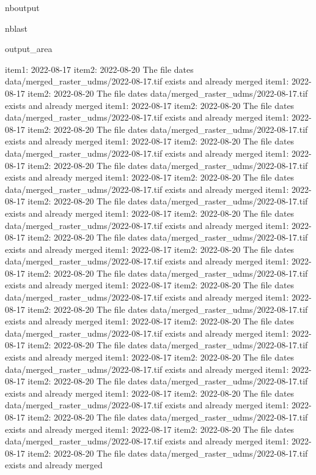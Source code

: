 \documentclass[letterpaper,10pt]{sphinxmanual}
\begin{document}
\begin{sphinxuseclass}{nboutput}
\begin{sphinxuseclass}{nblast}
{\begin{sphinxuseclass}{output_area}
\begin{sphinxuseclass}{}
\begin{sphinxVerbatim}[commandchars=\\\{\}]
item1:  2022-08-17
item2:  2022-08-20
The file dates data/merged\_raster\_udms/2022-08-17.tif exists and already merged
item1:  2022-08-17
item2:  2022-08-20
The file dates data/merged\_raster\_udms/2022-08-17.tif exists and already merged
item1:  2022-08-17
item2:  2022-08-20
The file dates data/merged\_raster\_udms/2022-08-17.tif exists and already merged
item1:  2022-08-17
item2:  2022-08-20
The file dates data/merged\_raster\_udms/2022-08-17.tif exists and already merged
item1:  2022-08-17
item2:  2022-08-20
The file dates data/merged\_raster\_udms/2022-08-17.tif exists and already merged
item1:  2022-08-17
item2:  2022-08-20
The file dates data/merged\_raster\_udms/2022-08-17.tif exists and already merged
item1:  2022-08-17
item2:  2022-08-20
The file dates data/merged\_raster\_udms/2022-08-17.tif exists and already merged
item1:  2022-08-17
item2:  2022-08-20
The file dates data/merged\_raster\_udms/2022-08-17.tif exists and already merged
item1:  2022-08-17
item2:  2022-08-20
The file dates data/merged\_raster\_udms/2022-08-17.tif exists and already merged
item1:  2022-08-17
item2:  2022-08-20
The file dates data/merged\_raster\_udms/2022-08-17.tif exists and already merged
item1:  2022-08-17
item2:  2022-08-20
The file dates data/merged\_raster\_udms/2022-08-17.tif exists and already merged
item1:  2022-08-17
item2:  2022-08-20
The file dates data/merged\_raster\_udms/2022-08-17.tif exists and already merged
item1:  2022-08-17
item2:  2022-08-20
The file dates data/merged\_raster\_udms/2022-08-17.tif exists and already merged
item1:  2022-08-17
item2:  2022-08-20
The file dates data/merged\_raster\_udms/2022-08-17.tif exists and already merged
item1:  2022-08-17
item2:  2022-08-20
The file dates data/merged\_raster\_udms/2022-08-17.tif exists and already merged
item1:  2022-08-17
item2:  2022-08-20
The file dates data/merged\_raster\_udms/2022-08-17.tif exists and already merged
item1:  2022-08-17
item2:  2022-08-20
The file dates data/merged\_raster\_udms/2022-08-17.tif exists and already merged
item1:  2022-08-17
item2:  2022-08-20
The file dates data/merged\_raster\_udms/2022-08-17.tif exists and already merged
item1:  2022-08-17
item2:  2022-08-20
The file dates data/merged\_raster\_udms/2022-08-17.tif exists and already merged
item1:  2022-08-17
item2:  2022-08-20
The file dates data/merged\_raster\_udms/2022-08-17.tif exists and already merged
item1:  2022-08-17
item2:  2022-08-20
The file dates data/merged\_raster\_udms/2022-08-17.tif exists and already merged
item1:  2022-08-17
item2:  2022-08-20
The file dates data/merged\_raster\_udms/2022-08-17.tif exists and already merged

\end{sphinxVerbatim}
\end{sphinxuseclass}
\end{sphinxuseclass}}
\end{sphinxuseclass}
\end{sphinxuseclass}
\end{document}
